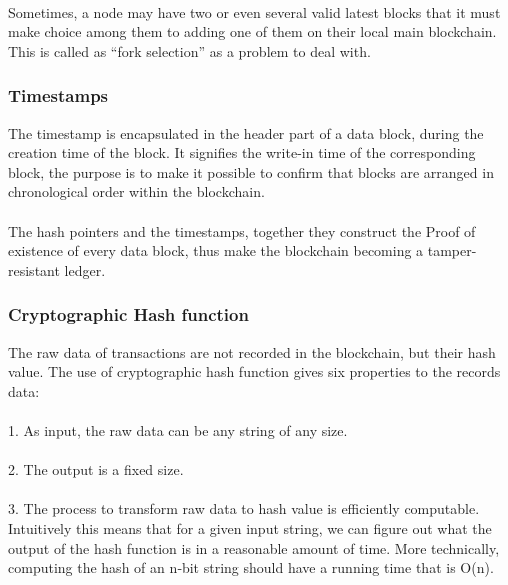 \documentclass[doublespacing]{bmcart}
\begin{document}
\begin{CJK*}{UTF8}{gbsn}
\paragraph{} 
Sometimes, a node may have two or even several valid latest blocks that it must make choice among them to adding one of them on their local main blockchain. This is called as ``fork selection'' as a problem to deal with.
\subsubsection*{Timestamps}
The timestamp is encapsulated in the header part of a data block, during the creation time of the block. It signifies the write-in time of the corresponding block, the purpose is to make it possible to confirm that blocks are arranged in chronological order within the blockchain.
\paragraph{} 
The hash pointers and the timestamps, together they construct the Proof of existence of every data block, thus make the blockchain becoming a tamper-resistant ledger. 
\subsubsection*{Cryptographic Hash function}
The raw data of transactions are not recorded in the blockchain, but their hash value. The use of cryptographic hash function gives six properties to the records data:
\paragraph{}  1. As input, the raw data can be any string of any size.
\paragraph{}  2. The output is a fixed size.
\paragraph{}  3. The process to transform raw data to hash value is efficiently computable. Intuitively this means that for a given input string, we can figure out what the output of the hash function is in a reasonable amount of time. More technically, computing the hash of an n‐bit string should have a running time that is O(n).

\end{CJK*}
\end{document}
